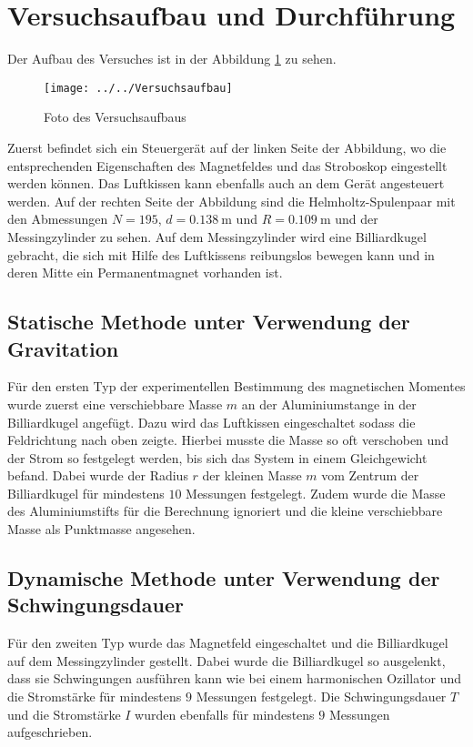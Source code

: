 \section{Versuchsaufbau und Durchführung}
\label{sec:Versuchsaufbau und Durchführung}
Der Aufbau des Versuches ist in der Abbildung \ref{fig:versuchsaufbau} zu sehen.
\begin{figure}[h]
	\centering
	\texttt{[image: ../../Versuchsaufbau]}
	\caption{Foto des Versuchsaufbaus}
	\label{fig:versuchsaufbau}
\end{figure}
Zuerst befindet sich ein Steuergerät auf der linken Seite der Abbildung, wo die entsprechenden Eigenschaften des Magnetfeldes und das Stroboskop eingestellt werden können. Das Luftkissen kann ebenfalls auch an dem Gerät angesteuert werden. Auf der rechten Seite der Abbildung sind die Helmholtz-Spulenpaar mit den Abmessungen $N=195$, $d=\SI{0.138}{\meter}$ und $R=\SI{0.109}{\meter}$ und der Messingzylinder zu sehen. Auf dem Messingzylinder wird eine Billiardkugel gebracht, die sich mit Hilfe des Luftkissens reibungslos bewegen kann und in deren Mitte ein Permanentmagnet vorhanden ist. 
\subsection{Statische Methode unter Verwendung der Gravitation}
Für den ersten Typ der experimentellen Bestimmung des magnetischen Momentes wurde zuerst eine verschiebbare Masse $m$  an der Aluminiumstange in der Billiardkugel angefügt. Dazu wird das Luftkissen eingeschaltet sodass die Feldrichtung nach oben zeigte. Hierbei musste die Masse so oft verschoben und der Strom so festgelegt werden, bis sich das System in einem Gleichgewicht befand. Dabei wurde der Radius $r$ der kleinen Masse $m$ vom Zentrum der Billiardkugel für mindestens $10$ Messungen festgelegt. Zudem wurde die Masse des Aluminiumstifts für die Berechnung ignoriert und die kleine verschiebbare Masse als Punktmasse angesehen. 
\subsection{Dynamische Methode unter Verwendung der Schwingungsdauer}
Für den zweiten Typ wurde das Magnetfeld eingeschaltet und die Billiardkugel auf dem Messingzylinder gestellt. Dabei wurde die Billiardkugel so ausgelenkt, dass sie Schwingungen ausführen kann wie bei einem harmonischen Ozillator und die Stromstärke für mindestens $9$ Messungen festgelegt. Die Schwingungsdauer $T$ und die Stromstärke $I$ wurden ebenfalls für mindestens $9$ Messungen aufgeschrieben.
